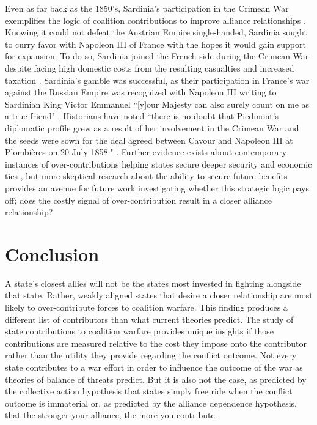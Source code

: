 \documentclass[12pt,letterpaper]{article}
\begin{document}
	Even as far back as the 1850's, Sardinia's participation in the Crimean War exemplifies the logic of coalition contributions to improve alliance relationships \citep[17-25]{blumberg_carefullyplannedaccident_1990}. Knowing it could not defeat the Austrian Empire single-handed, Sardinia sought to curry favor with Napoleon III of France with the hopes it would gain support for expansion. To do so, Sardinia joined the French side during the Crimean War despite facing high domestic costs from the resulting casualties and increased taxation \citep[326]{gorce_histoiresecondempire_1902}. Sardinia's gamble was successful, as their participation in France's war against the Russian Empire was recognized with Napoleon III writing to Sardinian King Victor Emmanuel ``[y]our Majesty can also surely count on me as a true friend" \citep[1]{boselli_napoleoniiivictor_1926}. Historians have noted ``there is no doubt that Piedmont's diplomatic profile grew as a result of her involvement in the Crimean War and the seeds were sown for the deal agreed between Cavour and Napoleon III at Plombi\`{e}res on 20 July 1858." \citep{rathbone_piedmont1850s_2008}. Further evidence exists about contemporary instances of over-contributions helping states secure deeper security \citep{slavin_buildswarcoalition_2003} and economic ties \citep{whitmore_uswarallies_2003}, but more skeptical research about the ability to secure future benefits \citep{porter_lastchargeknights_2010} provides an avenue for future work investigating whether this strategic logic pays off; does the costly signal of over-contribution result in a closer alliance relationship?

\section{Conclusion}
	A state's closest allies will not be the states most invested in fighting alongside that state. Rather, weakly aligned states that desire a closer relationship are most likely to over-contribute forces to coalition warfare. This finding produces a different list of contributors than what current theories predict. The study of state contributions to coalition warfare provides unique insights if those contributions are measured relative to the cost they impose onto the contributor rather than the utility they provide regarding the conflict outcome. Not every state contributes to a war effort in order to influence the outcome of the war as theories of balance of threats predict. But it is also not the case, as predicted by the collective action hypothesis that states simply free ride when the conflict outcome is immaterial or, as predicted by the alliance dependence hypothesis, that the stronger your alliance, the more you contribute.
\end{document}
